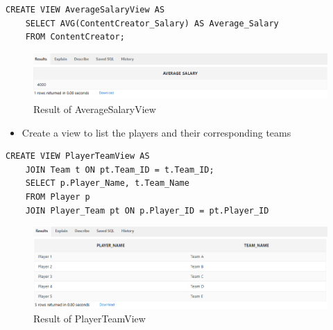 \begin{lstlisting}[caption={ AvgSalaryView },label={lst:V-2}]
    CREATE VIEW AverageSalaryView AS
    SELECT AVG(ContentCreator_Salary) AS Average_Salary
    FROM ContentCreator;
\end{lstlisting}
\begin{figure}[H]
    \centering
    \includegraphics[width=1\textwidth]{images/dml/views/v2.png}
    \caption{Result of AverageSalaryView}
\end{figure}
\begin{itemize}
    \item Create a view to list the players and their corresponding teams
\end{itemize}
\begin{lstlisting}[caption={ PlayerTeamView },label={lst:V-3}]
    CREATE VIEW PlayerTeamView AS
    JOIN Team t ON pt.Team_ID = t.Team_ID;
    SELECT p.Player_Name, t.Team_Name
    FROM Player p
    JOIN Player_Team pt ON p.Player_ID = pt.Player_ID
\end{lstlisting}
\begin{figure}[H]
    \centering
    \includegraphics[width=1\textwidth]{images/dml/views/v3.png}
    \caption{Result of PlayerTeamView}
\end{figure}
